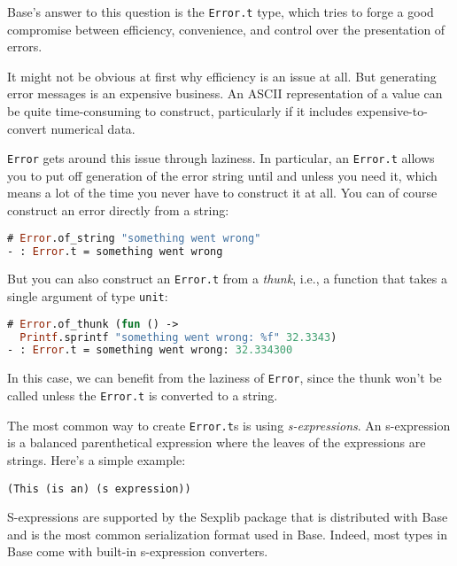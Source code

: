 Base's answer to this question is the \passthrough{\lstinline!Error.t!}
type, which tries to forge a good compromise between efficiency,
convenience, and control over the presentation of errors.

It might not be obvious at first why efficiency is an issue at all. But
generating error messages is an expensive business. An ASCII
representation of a value can be quite time-consuming to construct,
particularly if it includes expensive-to-convert numerical data.

\passthrough{\lstinline!Error!} gets around this issue through laziness.
In particular, an \passthrough{\lstinline!Error.t!} allows you to put
off generation of the error string until and unless you need it, which
means a lot of the time you never have to construct it at all. You can
of course construct an error directly from a string:

\begin{lstlisting}[language=Caml]
# Error.of_string "something went wrong"
- : Error.t = something went wrong
\end{lstlisting}

But you can also construct an \passthrough{\lstinline!Error.t!} from a
\emph{thunk}, i.e., a function that takes a single argument of type
\passthrough{\lstinline!unit!}:

\begin{lstlisting}[language=Caml]
# Error.of_thunk (fun () ->
  Printf.sprintf "something went wrong: %f" 32.3343)
- : Error.t = something went wrong: 32.334300
\end{lstlisting}

In this case, we can benefit from the laziness of
\passthrough{\lstinline!Error!}, since the thunk won't be called unless
the \passthrough{\lstinline!Error.t!} is converted to a string.

The most common way to create \passthrough{\lstinline!Error.t!}s is
using \emph{s-expressions}. An s-expression is a balanced parenthetical
expression where the leaves of the expressions are strings. Here's a
simple example: 

\begin{lstlisting}
(This (is an) (s expression))
\end{lstlisting}

S-expressions are supported by the Sexplib package that is distributed
with Base and is the most common serialization format used in Base.
Indeed, most types in Base come with built-in s-expression converters.

